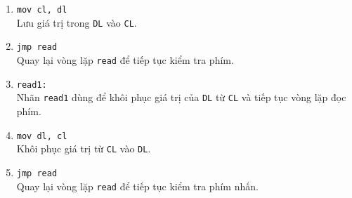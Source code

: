 \documentclass[12pt]{article}
\begin{document}
\begin{enumerate}[label=\textbf{\arabic*.}]
    \item \texttt{mov cl, dl} \\
    Lưu giá trị trong \texttt{DL} vào \texttt{CL}.
    
    \item \texttt{jmp read} \\
    Quay lại vòng lặp \texttt{read} để tiếp tục kiểm tra phím.

    \item \texttt{read1:} \\
    Nhãn \texttt{read1} dùng để khôi phục giá trị của \texttt{DL} từ \texttt{CL} và tiếp tục vòng lặp đọc phím.
    
    \item \texttt{mov dl, cl} \\
    Khôi phục giá trị từ \texttt{CL} vào \texttt{DL}.
    
    \item \texttt{jmp read} \\
    Quay lại vòng lặp \texttt{read} để tiếp tục kiểm tra phím nhấn.
\end{enumerate}
\end{document}
